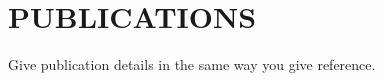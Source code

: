 \chapter*{PUBLICATIONS}
\par Give publication details in the same way you give reference.

\newpage
